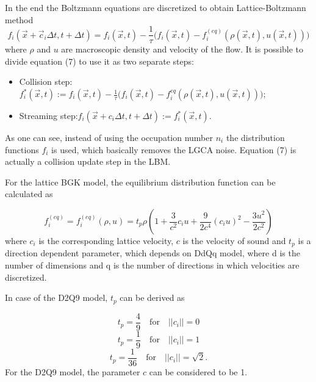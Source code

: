 In the end the Boltzmann equations are discretized to obtain Lattice-Boltzmann method
\begin{equation}
f_i(\vec{x} + \vec{c}_i \Delta t, t + \Delta t) = f_i(\vec{x},t) - \frac{1}{\tau} \big(f_i(\vec{x},t) - f_i^{(eq)}(\rho(\vec{x},t), u(\vec{x},t))\big)
\end{equation}
where $\rho$ and $u$ are macroscopic density and velocity of the flow. It is possible to divide equation (7) to use it as two separate steps:
\begin{itemize}
\item Collision step: $f_i^*(\vec{x},t) := f_i(\vec{x}, t) - \frac{1}{\tau} \big(f_i(\vec{x}, t) - f_i^{eq}(\rho(\vec{x},t),u(\vec{x},t))\big)$;
	
\item Streaming step:$f_i(\vec{x}+c_i\Delta t,t+\Delta t) := f_i^*(\vec{x},t)$.
\end{itemize}

	
As one can see, instead of using the occupation number $n_i$ the distribution functions $f_i$ is used, which basically removes the LGCA noise. Equation (7) is actually a collision update step in the LBM.

For the lattice BGK model, the equilibrium distribution function can be calculated as

\begin{equation}
f_i^{(eq)} = f_i^{(eq)}(\rho, u) = t_p \rho ( 1 + \frac{3}{c^2} c_i u + \frac{9}{2c^4} (c_i u)^2 - \frac{3u^2}{2c^2})
\end{equation}
where $c_i$ is the corresponding lattice velocity, $c$ is the velocity of sound and $t_p$ is a direction dependent parameter, which depends on DdQq model, where d is the number of dimensions and q is the number of directions in which velocities are discretized.

In case of the D2Q9 model, $t_p$ can be derived as

\begin{equation}
t_p = \frac{4}{9} \quad \textrm{for} \quad ||c_i||=0
\end{equation}
\begin{equation}
t_p = \frac{1}{9} \quad \textrm{for} \quad ||c_i||=1
\end{equation}
\begin{equation}
t_p = \frac{1}{36} \quad \textrm{for} \quad ||c_i||=\sqrt{2}.
\end{equation}
For the D2Q9 model, the parameter $c$ can be considered to be 1.